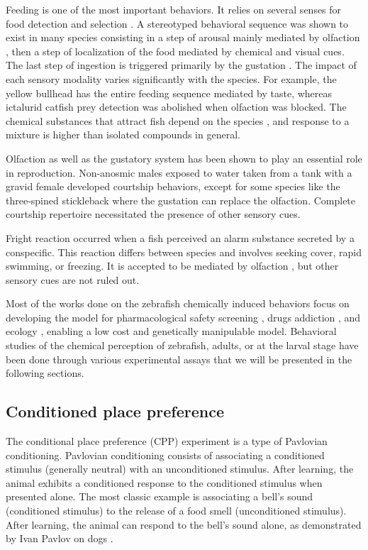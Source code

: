    Feeding is one of the most important behaviors. It relies on several senses for food detection and selection \cite{pavlov1990sensory}. A stereotyped behavioral sequence was shown to exist in many species \cite{atema1980chemical} consisting in a step of arousal mainly mediated by olfaction \cite{bateson1890sense}, then a step of localization of the food mediated by chemical and visual cues. The last step of ingestion is triggered primarily by the gustation \cite{atema1980chemical}. The impact of each sensory modality varies significantly with the species. For example, the yellow bullhead has the entire feeding sequence mediated by taste, whereas ictalurid catfish prey detection was abolished when olfaction was blocked. The chemical substances that attract fish depend on the species \cite{atema1980chemical}, and response to a mixture is higher than isolated compounds in general.

    Olfaction \cite{tavolga1956visual} as well as the gustatory system \cite{de1983influence} has been shown to play an essential role in reproduction. Non-anosmic males exposed to water taken from a tank with a gravid female developed courtship behaviors, except for some species like the three-spined stickleback where the gustation can replace the olfaction. Complete courtship repertoire necessitated the presence of other sensory cues.

    Fright reaction occurred when a fish perceived an alarm substance secreted by a conspecific. This reaction differs between species and involves seeking cover, rapid swimming, or freezing. It is accepted to be mediated by olfaction \cite{frisch1942schreckstoff,speedie2008alarm,doving2009alarm}, but other sensory cues are not ruled out.

    Most of the works done on the zebrafish chemically induced behaviors focus on developing the model for pharmacological safety screening \cite{cassar2019use}, drugs addiction \cite{klee2012zebrafish}, and ecology \cite{dai2014zebrafish}, enabling a low cost and genetically manipulable model. Behavioral studies of the chemical perception of zebrafish, adults, or at the larval stage have been done through various experimental assays that we will be presented in the following sections.

    \subsection{Conditioned place preference}
    The conditional place preference (CPP) experiment is a type of Pavlovian conditioning. Pavlovian conditioning consists of associating a conditioned stimulus (generally neutral) with an unconditioned stimulus. After learning, the animal exhibits a conditioned response to the conditioned stimulus when presented alone. The most classic example is associating a bell's sound (conditioned stimulus) to the release of a food smell (unconditioned stimulus). After learning, the animal can respond to the bell's sound alone, as demonstrated by Ivan Pavlov on dogs \cite{pavlov1903experimental}.

